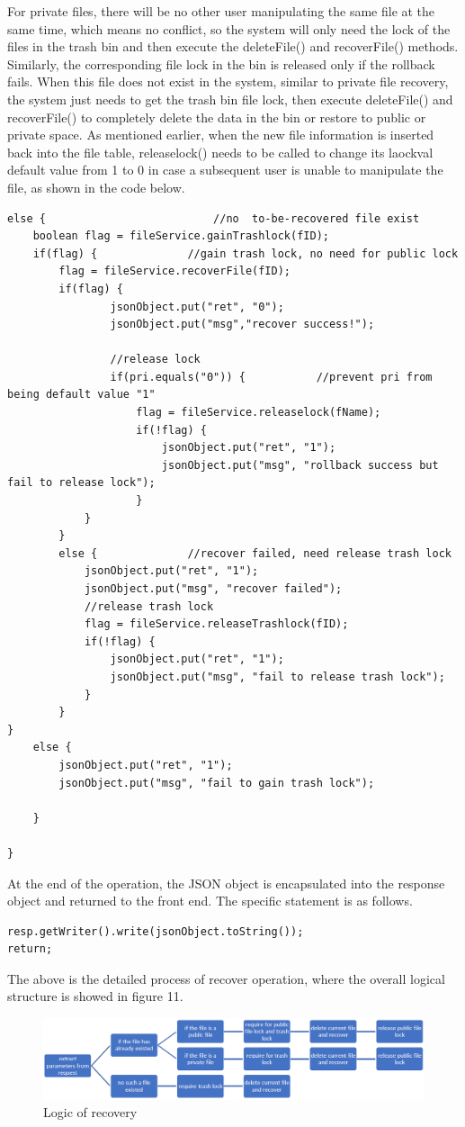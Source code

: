 \documentclass[a4paper,11pt]{article}
\begin{document}
\par For private files, there will be no other user manipulating the same file at the same time, which means no conflict, so the system will only need the lock of the files in the trash bin and then execute the deleteFile() and recoverFile() methods. Similarly, the corresponding file lock in the bin is released only if the rollback fails. When this file does not exist in the system, similar to private file recovery, the system just needs to get the trash bin file lock, then execute deleteFile() and recoverFile() to completely delete the data in the bin or restore to public or private space. As mentioned earlier, when the new file information is inserted back into the file table, releaselock() needs to be called to change its laockval default value from 1 to 0 in case a subsequent user is unable to manipulate the file, as shown in the code below.
\begin{lstlisting}
else {							//no  to-be-recovered file exist
	boolean flag = fileService.gainTrashlock(fID);
	if(flag) {				//gain trash lock, no need for public lock
		flag = fileService.recoverFile(fID);
		if(flag) {				
				jsonObject.put("ret", "0");
				jsonObject.put("msg","recover success!");
				
				//release lock
				if(pri.equals("0")) {	   		//prevent pri from being default value "1"							
				 	flag = fileService.releaselock(fName);
				 	if(!flag) {
						jsonObject.put("ret", "1");
						jsonObject.put("msg", "rollback success but fail to release lock");
					}
			}
		}
		else {				//recover failed, need release trash lock
			jsonObject.put("ret", "1");
			jsonObject.put("msg", "recover failed");
			//release trash lock 
			flag = fileService.releaseTrashlock(fID);
			if(!flag) {
				jsonObject.put("ret", "1");
				jsonObject.put("msg", "fail to release trash lock");
			}
		}
}
	else {
		jsonObject.put("ret", "1");
		jsonObject.put("msg", "fail to gain trash lock");
	
	}
	
}
\end{lstlisting}
\par At the end of the operation, the JSON object is encapsulated into the response object and returned to the front end. The specific statement is as follows.
\begin{lstlisting}
resp.getWriter().write(jsonObject.toString());
return;
\end{lstlisting}
\par The above is the detailed process of recover operation, where the overall logical structure is showed in figure 11.
\begin{figure}[ht]

\centering
\includegraphics[scale=0.506]{logic.png}
\caption{Logic of recovery}
\label{fig:1}
\end{figure}
\end{document}
